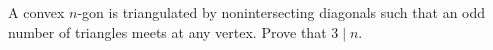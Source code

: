 A convex $n$-gon is triangulated by nonintersecting diagonals such that an odd number of triangles meets at any vertex. Prove that $3 \mid n$.
